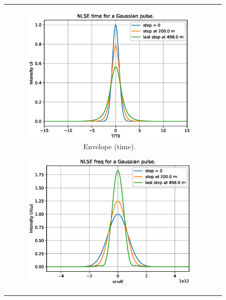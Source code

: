          \begin{figure}[label={fig:n1nb}, caption={Solution of the NLSE using SSFM for N=1 and $\beta_2 < 0$.}]
         \centering	
         \begin{tabular}[c]{cc}
         \centering	
        \begin{subfigure}[b]{.53\textwidth}
		    \centering	
            \includegraphics[width=1\linewidth]{figures/chap3/SSFM/eN1nbt.eps}
            \caption{Envelope (time).}
            \label{fig:eN1nbt}
        \end{subfigure}
        \hfill
        \begin{subfigure}[b]{.53\textwidth}
		    \centering	
            \includegraphics[width=1\linewidth]{figures/chap3/SSFM/eN1nbs.eps}

\end{subfigure}
\end{tabular}
\end{figure}
